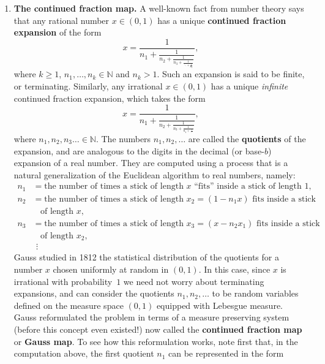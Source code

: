 \documentclass[12pt]{article}
\newcommand{\N}{\mathbb{N}}
\theoremstyle{example}
\begin{document}
\begin{enumerate}[1.]
We have seen before that the measure space $[0,1]$ with Lebesgue measure is isomorphic to the product space of an infinite sequence of i.i.d.\ unbiased coin tosses. It is easy to see that under this isomorphism, the doubling map translates to the shift map $S$ of the Bernoulli sequence. So, the doubling map is really a disguised version of the Bernoulli shift associated with i.i.d.\ unbiased coin tosses.

\item \textbf{The continued fraction map.} A well-known fact from number theory says that any
rational number $x\in (0,1)$ has a unique \textbf{continued fraction expansion} of the form
$$ x = \frac{1}{n_1+\frac{1}{n_2+\frac{1}{n_3+\frac{1}{\ddots+\frac{1}{n_k}}}}},
$$
where $k\ge 1$, $n_1,\ldots,n_k\in \N$ and $n_k>1$. Such an expansion is said to be finite, or terminating. Similarly,
any irrational $x\in(0,1)$ has a unique \emph{infinite} continued fraction expansion, which takes the form
$$ x = \frac{1}{n_1+\frac{1}{n_2+\frac{1}{n_3+\frac{1}{n_4+\frac{1}{\ldots}}}}},
$$
where $n_1,n_2,n_3\ldots \in \N$. The numbers $n_1,n_2,\ldots$ are called the \textbf{quotients} of the expansion, and are analogous to the digits in the decimal (or base-$b$) expansion of a real number. They are computed using a process that is a natural generalization of the Euclidean algorithm to real numbers, namely:
\begin{align*}
n_1 &= \textrm{the number of times a stick of length $x$ ``fits'' inside a stick of length $1$}, \\
n_2 &= \textrm{the number of times a stick of length $x_2=(1-n_1x)$ fits inside a stick}\\ &\ \ \ \ \textrm{of length $x$},
\\
n_3 &= \textrm{the number of times a stick of length $x_3=(x-n_2x_1)$ fits inside a stick}
\\ &\ \ \ \ \textrm{of length $x_2$}, \\
& \ \,\vdots
\end{align*}
Gauss studied in 1812 the statistical distribution of the quotients for a number $x$ chosen uniformly at random in $(0,1)$. In this case, since $x$ is irrational with probability~$1$ we need not worry about terminating expansions, and can consider the quotients $n_1, n_2, \ldots$ to be random variables defined on the measure space $(0,1)$ equipped with Lebesgue measure. Gauss reformulated the problem in terms of a measure preserving system (before this concept even existed!) now called the \textbf{continued fraction map} or \textbf{Gauss map}. To see how this reformulation works, note first that, in the computation above, the first quotient $n_1$ can be represented in the form

\end{enumerate}
\end{document}
